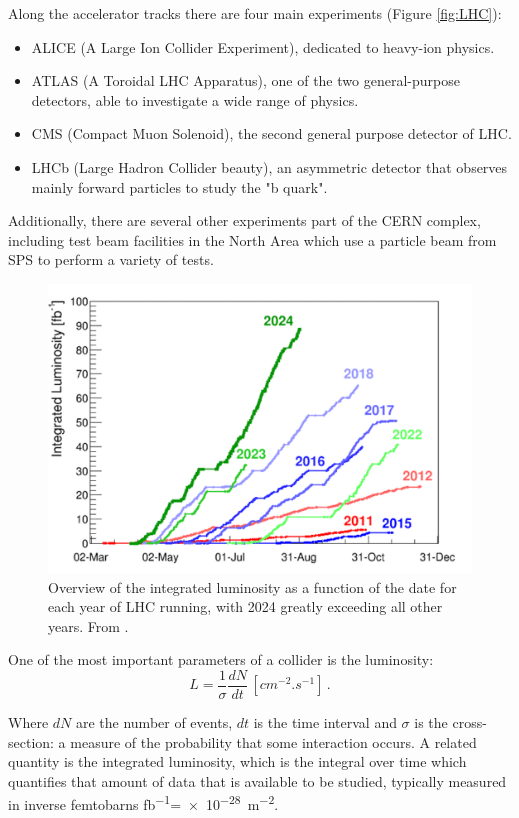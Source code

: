 Along the accelerator tracks there are four main experiments (Figure \ref{fig:LHC}):
\begin{itemize}
    \item ALICE (A Large Ion Collider Experiment), dedicated to heavy-ion physics\cite{homeALICE}.
    \item ATLAS (A Toroidal LHC Apparatus), one of the two general-purpose detectors, able to investigate a wide range of physics.
    \item CMS (Compact Muon Solenoid), the second general purpose detector of LHC.
    \item LHCb (Large Hadron Collider beauty), an asymmetric detector that observes mainly forward particles to study the "b quark".
\end{itemize}

Additionally, there are several other experiments part of the CERN complex, including test beam facilities in the North Area which use a particle beam from SPS to perform a variety of tests.

\begin{figure}[!ht]
    \centering
    \includegraphics[width=.6\linewidth]{Images/intro/integrated_luminosity.png}
    \captionsetup{width=.8\linewidth}
    \caption{Overview of the integrated luminosity as a function of the date for each year of LHC running, with 2024 greatly exceeding all other years. From \cite{homeAcceleratorReport}.}
    \label{fig:integrated_luminosity}
\end{figure}

One of the most important parameters of a collider is the luminosity:
\begin{equation}
    L = \frac{1}{\sigma}\frac{dN}{dt} \, \left[\unit{cm^{-2}.s^{-1}}\right] \, .
\end{equation}

Where $dN$ are the number of events, $dt$ is the time interval and $\sigma$ is the cross-section: a measure of the probability that some interaction occurs. A related quantity is the integrated luminosity, which is the integral over time which quantifies that amount of data that is available to be studied, typically measured in inverse femtobarns \unit{\femto\barn^{-1}}=\qty{e-28}{\meter^{-2}}.

